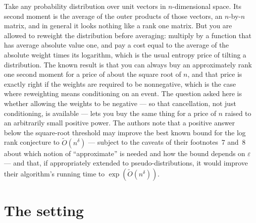 \documentclass{aicr-conjecture}
\newcommand{\Ot}{\tilde{O}}
\begin{document}

\vspace{0.4em}

\begin{informalconjecture}
Take any probability distribution over unit vectors in
$n$-dimensional space. Its second moment is the average of the outer
products of those vectors, an $n$-by-$n$ matrix, and in general it
looks nothing like a rank one matrix. But you are allowed to reweight
the distribution before averaging: multiply by a function that has
average absolute value one, and pay a cost equal to the average of the
absolute weight times its logarithm, which is the usual entropy price
of tilting a distribution. The known result is that you can always buy
an approximately rank one second moment for a price of about the
square root of $n$, and that price is exactly right if the weights are
required to be nonnegative, which is the case where reweighting means
conditioning on an event. The question asked here is whether allowing
the weights to be negative --- so that cancellation, not just
conditioning, is available --- lets you buy the same thing for a price
of $n$ raised to an arbitrarily small positive power. The authors note
that a positive answer below the square-root threshold may improve the
best known bound for the log rank conjecture to $\Ot(n^{\delta})$ ---
subject to the caveats of their footnotes~7 and~8 about which notion
of ``approximate'' is needed and how the bound depends on $\varepsilon$
--- and that, if appropriately extended to pseudo-distributions, it
would improve their algorithm's running time to
$\exp(\Ot(n^{\delta}))$.
\end{informalconjecture}

\section{The setting}\label{sec:setting}
\end{document}
